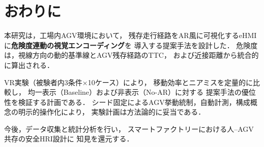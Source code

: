 \section{おわりに}
\label{sec:conclusion}

本研究は，工場内AGV環境において，
残存走行経路をAR風に可視化するeHMIに\textbf{危険度連動の視覚エンコーディング}を
導入する提案手法を設計した．
危険度は，視線方向の動的基準線とAGV残存経路のTTC，
および近接距離から統合的に算出される．

VR実験（被験者内3条件×10ケース）により，
移動効率とニアミスを定量的に比較し，
均一表示（Baseline）および非表示（No-AR）に対する
提案手法の優位性を検証する計画である．
シード固定によるAGV挙動統制，自動計測，構成概念の明示的操作化により，
実験計画は方法論的に妥当である．

今後，データ収集と統計分析を行い，
スマートファクトリーにおける人--AGV共存の安全HRI設計に
知見を還元する．
